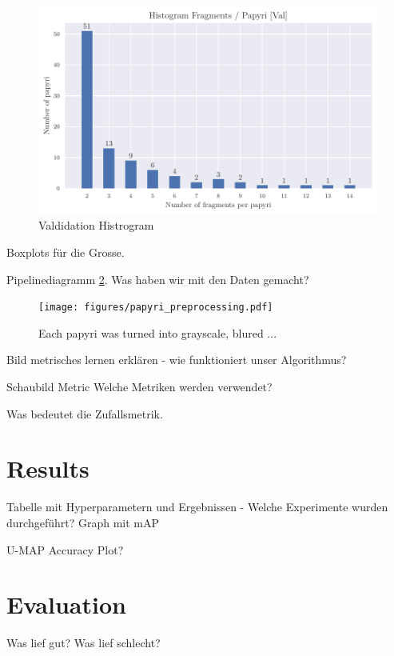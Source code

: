 \begin{figure}[t]
	\label{fig:hist_val}
	\includegraphics[width=\textwidth]{figures/HistogramFragAfterVal.pdf}
	\caption{Valdidation Histrogram}
\end{figure}

Boxplots für die Grosse. 


Pipelinediagramm \ref{fig:papyri_preprocessing}. Was haben wir mit den Daten gemacht?

\begin{figure}[t]
	\label{fig:papyri_preprocessing}
	\texttt{[image: figures/papyri\_preprocessing.pdf]}
	\caption{Each papyri was turned into grayscale, blured ...}
\end{figure}


Bild metrisches lernen erklären - wie funktioniert unser Algorithmus?


Schaubild Metric Welche Metriken werden verwendet?

Was bedeutet die Zufallsmetrik. 



\section{Results}
Tabelle mit Hyperparametern und Ergebnissen - Welche Experimente wurden durchgeführt? 
Graph mit mAP 

U-MAP
Accuracy Plot?

\section{Evaluation}
Was lief gut?
Was lief schlecht?